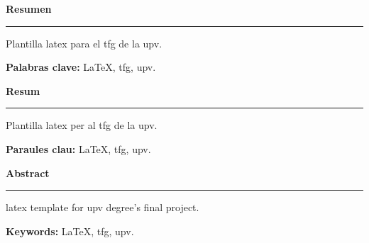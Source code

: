 

\begin{flushright}
	\noindent \textbf{\Huge{Resumen}}
	\vspace*{0.3cm}
	\hrule
	\vspace*{-0.3cm}
\end{flushright}

Plantilla \gls{latex} para el \acrfull{tfg} de la \acrshort{upv}.

\noindent \textbf{Palabras clave:} \LaTeX, \acrshort{tfg}, \acrshort{upv}.

\vspace{2cm}


\begin{flushright}
	\noindent \textbf{\Huge{Resum}}
	\vspace*{0.3cm}
	\hrule
	\vspace*{-0.3cm}
\end{flushright}

Plantilla \gls{latex} per al \acrfull{tfg} de la \acrshort{upv}.

\noindent \textbf{Paraules clau:} \LaTeX, \acrshort{tfg}, \acrshort{upv}.

\vspace{2cm}


\begin{flushright}
	\noindent \textbf{\Huge{Abstract}}
	\vspace*{0.3cm}
	\hrule
	\vspace*{-0.3cm}
\end{flushright}

\gls{latex} template for \acrshort{upv} degree's final project.

\noindent \textbf{Keywords:} \LaTeX, \acrshort{tfg}, \acrshort{upv}.